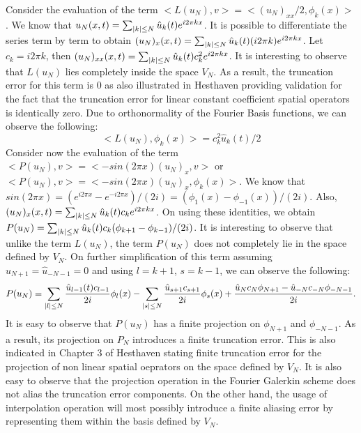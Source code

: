 \documentclass[12pt]{article}
\DeclarePairedDelimiter\abs{\lvert}{\rvert}
\begin{document}
Consider the evaluation of the term $<L(u_N), v> = <(u_N)_{xx}/2, \phi_k(x)>$. We know that $ u_N(x, t) = \sum_{\abs{k} \leq N} \hat{u}_k(t) e^{i2 \pi kx}$. It is possible to differentiate the series term by term to obtain $(u_N)_{x}(x, t) = \sum_{\abs{k} \leq N} \hat{u}_k(t) (i 2 \pi k) e^{i2 \pi kx}$. Let $c_k = i2 \pi k$, then $(u_N)_{xx}(x, t) = \sum_{\abs{k} \leq N} \hat{u}_k(t) c_k^2 e^{i2 \pi kx}$. It is interesting to observe that $L(u_N)$ lies completely inside the space $V_N$. As a result, the truncation error for this term is $0$ as also illustrated in Hesthaven providing validation for the fact that the truncation error for linear constant coefficient spatial operators is identically zero. Due to orthonormality of the Fourier Basis functions, we can observe the following:
\begin{equation}
    <L(u_N), \phi_k(x)> =c_k^2 \hat{u}_k(t)/2
    \label{LuN}
\end{equation}
Consider now the evaluation of the term $<P(u_N), v> = <-sin(2 \pi x)(u_N)_x, v>$ or $<P(u_N), v> = <-sin(2 \pi x)(u_N)_x, \phi_k(x)>$. We know that $sin(2 \pi x) = (e^{i 2 \pi x} - e^{-i 2 \pi x})/(2i) = (\phi_1(x) - \phi_{-1}(x))/(2i)$. Also, $(u_N)_{x}(x, t) = \sum_{\abs{k} \leq N}  \hat{u}_k(t) c_k e^{i2 \pi kx}$. On using these identities, we obtain $P(u_N) = \sum_{\abs{k} \leq N} \hat{u}_k(t) c_k (\phi_{k + 1} - \phi_{k - 1})/(2i)$. It is interesting to observe that unlike the term $L(u_N)$, the term $P(u_N)$ does not completely lie in the space defined by $V_N$. On further simplification of this term assuming $\hat{u}_{N + 1} = \hat{u}_{-N - 1} = 0$ and using $l = k + 1$, $s = k  - 1$, we can observe the following:
\begin{equation}
    P(u_N) = \sum_{\abs{l} \leq N} \frac{ \hat{u}_{l - 1}(t) c_{l - 1} }{2i} \phi_l(x) - \sum_{\abs{s} \leq N} \frac{\hat{u}_{s + 1} c_{s + 1}}{2i} \phi_s(x) + \frac{ \hat{u}_{N} c_{N} \phi_{N + 1} - \hat{u}_{-N} c_{-N} \phi_{-N - 1} }{2i}. 
    \label{PuN}
\end{equation}
It is easy to observe that $P(u_N)$ has a finite projection on $\phi_{N + 1}$ and $\phi_{-N - 1}$. As a result, its projection on $P_N$ introduces a finite truncation error. This is also indicated in Chapter $3$ of Hesthaven stating finite truncation error for the projection of non linear spatial oeprators on the space defined by $V_N$. It is also easy to observe that the projection operation in the Fourier Galerkin scheme does not alias the truncation error components. On the other hand, the usage of interpolation operation will most possibly introduce a finite aliasing error by representing them within the basis defined by $V_N$.
\end{document}
